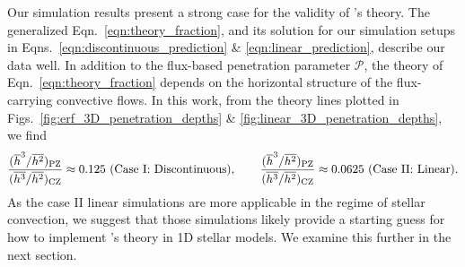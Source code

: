 \documentclass{aastex631}
\newcommand{\mP}{\ensuremath{\mathcal{P}}}
\begin{document}
Our simulation results present a strong case for the validity of \citet{zahn1991}'s theory.
The generalized Eqn.~\ref{eqn:theory_fraction}, and its solution for our simulation setups in Eqns.~\ref{eqn:discontinuous_prediction} \& \ref{eqn:linear_prediction}, describe our data well.
In addition to the flux-based penetration parameter $\mP$, the theory of Eqn.~\ref{eqn:theory_fraction} depends on the horizontal structure of the flux-carrying convective flows.
In this work, from the theory lines plotted in Figs.~\ref{fig:erf_3D_penetration_depths} \& \ref{fig:linear_3D_penetration_depths}, we find
\begin{equation}
\frac{(\overline{h}^3/\overline{h^2})_{\rm{PZ}}}{(\overline{h^3}/\overline{h^2})_{\rm{CZ}}} \approx 0.125 \,\,(\text{Case I: Discontinuous}),\qquad
\frac{(\overline{h}^3/\overline{h^2})_{\rm{PZ}}}{(\overline{h^3}/\overline{h^2})_{\rm{CZ}}} \approx 0.0625 \,\,(\text{Case II: Linear}).
\label{eqn:fit_h_values}
\end{equation}
As the case II linear simulations are more applicable in the regime of stellar convection, we suggest that those simulations likely provide a starting guess for how to implement \citet{zahn1991}'s theory in 1D stellar models.
We examine this further in the next section.
\end{document}
